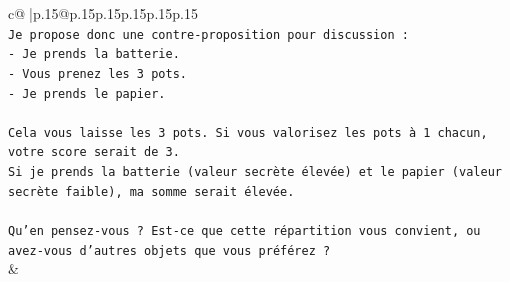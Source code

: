 \documentclass{article}
\begin{document}
{\begin{supertabular}{c@{$\;$}|p{.15\linewidth}@{}p{.15\linewidth}p{.15\linewidth}p{.15\linewidth}p{.15\linewidth}p{.15\linewidth}}
{{{\\ 
\texttt{Je propose donc une contre{-}proposition pour discussion :} \\
\texttt{{-} Je prends la batterie.} \\
\texttt{{-} Vous prenez les 3 pots.} \\
\texttt{{-} Je prends le papier.} \\
\\ 
\texttt{Cela vous laisse les 3 pots. Si vous valorisez les pots à 1 chacun, votre score serait de 3.} \\
\texttt{Si je prends la batterie (valeur secrète élevée) et le papier (valeur secrète faible), ma somme serait élevée.} \\
\\ 
\texttt{Qu'en pensez{-}vous ? Est{-}ce que cette répartition vous convient, ou avez{-}vous d'autres objets que vous préférez ?} \\
            }
        }
    }
    & \\ \\


\end{supertabular}}
\end{document}
